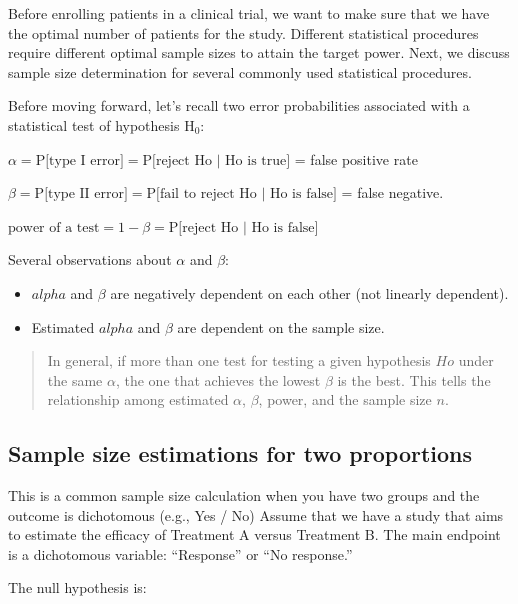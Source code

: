 \documentclass[
]{book}
\begin{document}
Before enrolling patients in a clinical trial, we want to make sure that we have the optimal number of patients for the study. Different statistical procedures require different optimal sample sizes to attain the target power. Next, we discuss sample size determination for several commonly used statistical procedures.

Before moving forward, let's recall two error probabilities associated with a statistical test of hypothesis \(\text{H}_{\text{0}}\):

\(\alpha = \text{P[type I error]} = \text{P[reject Ho | Ho is true]}\) = false positive rate

\(\beta = \text{P[type II error]} = \text{P[fail to reject Ho | Ho is false]}\) = false negative.

\(\text{power of a test} = 1 - \beta =\text{P[reject Ho | Ho is false]}\)

Several observations about \(\alpha\) and \(\beta\):

\begin{itemize}
\item
  \(alpha\) and \(\beta\) are negatively dependent on each other (not linearly dependent).
\item
  Estimated \(alpha\) and \(\beta\) are dependent on the sample size.
\end{itemize}

\begin{quote}
In general, if more than one test for testing a given hypothesis \(Ho\) under the same \(\alpha\), the one that achieves the lowest \(\beta\) is the best. This tells the relationship among estimated \(\alpha\), \(\beta\), power, and the sample size \(n\).
\end{quote}

\hypertarget{sample-size-estimations-for-two-proportions}{%
\subsection{\texorpdfstring{Sample size estimations for \textbf{two proportions}}{Sample size estimations for two proportions}}\label{sample-size-estimations-for-two-proportions}}

This is a common sample size calculation when you have two groups and the outcome is dichotomous (e.g., Yes / No)
Assume that we have a study that aims to estimate the efficacy of Treatment A versus Treatment B. The main endpoint is a dichotomous variable: ``Response'' or ``No response.''

The null hypothesis is:
\end{document}

